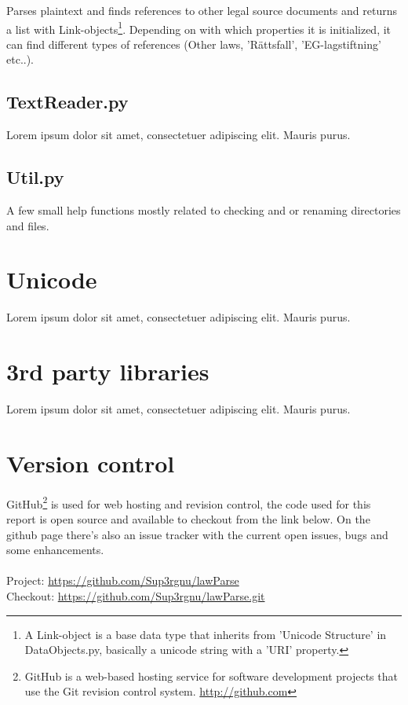 \documentclass[a4paper,11pt]{kth-mag}
\begin{document}
Parses plaintext and finds references to other legal source documents and
returns a list with Link-objects\footnote{A Link-object is a base data type
that inherits from 'Unicode Structure' in DataObjects.py, basically a unicode
string with a 'URI' property.}. Depending on with which properties it is
initialized, it can find different types of references (Other laws,
'Rättsfall', 'EG-lagstiftning' etc..).

\subsection{TextReader.py}

Lorem ipsum dolor sit amet, consectetuer adipiscing elit. Mauris
purus. 

\subsection{Util.py}

A few small help functions mostly related to checking and or renaming directories and files. 

\section{Unicode}

Lorem ipsum dolor sit amet, consectetuer adipiscing elit. Mauris
purus. 

\section{3rd party libraries}

Lorem ipsum dolor sit amet, consectetuer adipiscing elit. Mauris
purus. 

\section{Version control}

GitHub\footnote{GitHub is a web-based hosting service for software development
projects that use the Git revision control system. \url{http://github.com}} is
used for web hosting and revision control, the code used for this report is
open source and available to checkout from the link below. On the github page
there's also an issue tracker with the current open issues, bugs and some
enhancements.\\\\
Project: \url{https://github.com/Sup3rgnu/lawParse}\\
Checkout: \url{https://github.com/Sup3rgnu/lawParse.git}
\end{document}
